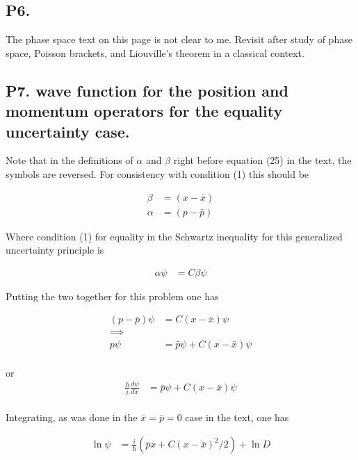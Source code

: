 \subsection{P6. }

The phase space text on this page is not clear to me.  Revisit after study
of phase space, Poisson brackets, and Liouville's theorem in a classical
context.

\subsection{P7. wave function for the position and momentum operators for the equality uncertainty case. }

Note that in the definitions of $\alpha$ and $\beta$ right before equation (25) in the text, the symbols are reversed.  For consistency with condition (1)
this should be

\begin{align*}
\beta &= (x - \bar{x}) \\
\alpha &= (p - \bar{p})
\end{align*}

Where condition (1) for equality in the Schwartz inequality for this 
generalized uncertainty principle is

\begin{align*}
\alpha \psi &= C \beta \psi
\end{align*}

Putting the two together for this problem one has

\begin{align*}
(p - \bar{p}) \psi &= C (x - \bar{x}) \psi \\
\implies \\
p \psi &= \bar{p} \psi + C (x - \bar{x}) \psi \\
\end{align*}

or
\begin{align*}
\frac{\hbar}{i} \frac{d\psi}{dx} &= \bar{p} \psi + C (x - \bar{x}) \psi \\
\end{align*}

Integrating, as was done in the $\bar{x} = \bar{p} = 0$ case in the text, 
one has

\begin{align*}
\ln \psi &= \frac{i}{\hbar}( \bar{p} x + C (x - \bar{x})^2/2 ) + \ln D \\
\end{align*}

